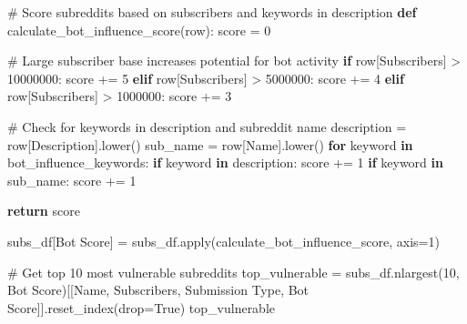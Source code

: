 \documentclass[
  letterpaper,
  DIV=11,
  numbers=noendperiod]{scrartcl}
\newenvironment{Shaded}{\begin{snugshade}}{\end{snugshade}}
\newcommand{\BuiltInTok}[1]{\textcolor[rgb]{0.00,0.23,0.31}{#1}}
\newcommand{\CommentTok}[1]{\textcolor[rgb]{0.37,0.37,0.37}{#1}}
\newcommand{\ControlFlowTok}[1]{\textcolor[rgb]{0.00,0.23,0.31}{\textbf{#1}}}
\newcommand{\DecValTok}[1]{\textcolor[rgb]{0.68,0.00,0.00}{#1}}
\newcommand{\KeywordTok}[1]{\textcolor[rgb]{0.00,0.23,0.31}{\textbf{#1}}}
\newcommand{\NormalTok}[1]{\textcolor[rgb]{0.00,0.23,0.31}{#1}}
\newcommand{\OperatorTok}[1]{\textcolor[rgb]{0.37,0.37,0.37}{#1}}
\newcommand{\StringTok}[1]{\textcolor[rgb]{0.13,0.47,0.30}{#1}}
\newcommand{\VariableTok}[1]{\textcolor[rgb]{0.07,0.07,0.07}{#1}}
\begin{document}
\begin{Shaded}
\begin{Highlighting}[]
\CommentTok{\# Score subreddits based on subscribers and keywords in description}
\KeywordTok{def}\NormalTok{ calculate\_bot\_influence\_score(row):}
\NormalTok{    score }\OperatorTok{=} \DecValTok{0}
    
    \CommentTok{\# Large subscriber base increases potential for bot activity}
    \ControlFlowTok{if}\NormalTok{ row[}\StringTok{\textquotesingle{}Subscribers\textquotesingle{}}\NormalTok{] }\OperatorTok{\textgreater{}} \DecValTok{10000000}\NormalTok{:}
\NormalTok{        score }\OperatorTok{+=} \DecValTok{5}
    \ControlFlowTok{elif}\NormalTok{ row[}\StringTok{\textquotesingle{}Subscribers\textquotesingle{}}\NormalTok{] }\OperatorTok{\textgreater{}} \DecValTok{5000000}\NormalTok{:}
\NormalTok{        score }\OperatorTok{+=} \DecValTok{4}
    \ControlFlowTok{elif}\NormalTok{ row[}\StringTok{\textquotesingle{}Subscribers\textquotesingle{}}\NormalTok{] }\OperatorTok{\textgreater{}} \DecValTok{1000000}\NormalTok{:}
\NormalTok{        score }\OperatorTok{+=} \DecValTok{3}
        
    \CommentTok{\# Check for keywords in description and subreddit name}
\NormalTok{    description }\OperatorTok{=}\NormalTok{ row[}\StringTok{\textquotesingle{}Description\textquotesingle{}}\NormalTok{].lower()}
\NormalTok{    sub\_name }\OperatorTok{=}\NormalTok{ row[}\StringTok{\textquotesingle{}Name\textquotesingle{}}\NormalTok{].lower()}
    \ControlFlowTok{for}\NormalTok{ keyword }\KeywordTok{in}\NormalTok{ bot\_influence\_keywords:}
        \ControlFlowTok{if}\NormalTok{ keyword }\KeywordTok{in}\NormalTok{ description:}
\NormalTok{            score }\OperatorTok{+=} \DecValTok{1}
        \ControlFlowTok{if}\NormalTok{ keyword }\KeywordTok{in}\NormalTok{ sub\_name:}
\NormalTok{            score }\OperatorTok{+=} \DecValTok{1}
            
    \ControlFlowTok{return}\NormalTok{ score}

\NormalTok{subs\_df[}\StringTok{\textquotesingle{}Bot Score\textquotesingle{}}\NormalTok{] }\OperatorTok{=}\NormalTok{ subs\_df.}\BuiltInTok{apply}\NormalTok{(calculate\_bot\_influence\_score, axis}\OperatorTok{=}\DecValTok{1}\NormalTok{)}

\CommentTok{\# Get top 10 most vulnerable subreddits}
\NormalTok{top\_vulnerable }\OperatorTok{=}\NormalTok{ subs\_df.nlargest(}\DecValTok{10}\NormalTok{, }\StringTok{\textquotesingle{}Bot Score\textquotesingle{}}\NormalTok{)[[}\StringTok{\textquotesingle{}Name\textquotesingle{}}\NormalTok{, }\StringTok{\textquotesingle{}Subscribers\textquotesingle{}}\NormalTok{, }\StringTok{\textquotesingle{}Submission Type\textquotesingle{}}\NormalTok{, }\StringTok{\textquotesingle{}Bot Score\textquotesingle{}}\NormalTok{]].reset\_index(drop}\OperatorTok{=}\VariableTok{True}\NormalTok{)}
\NormalTok{top\_vulnerable}
\end{Highlighting}
\end{Shaded}
\end{document}
